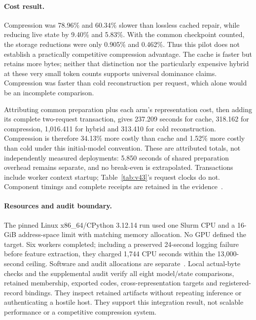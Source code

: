 \documentclass[10pt,twocolumn,letterpaper]{article}
\begin{document}
\paragraph{Cost result.}
Compression was 78.96\% and 60.34\% slower than lossless cached repair, while
reducing live state by 9.40\% and 5.83\%. With the common checkpoint counted, the
storage reductions were only 0.905\% and 0.462\%. Thus this pilot does not establish
a practically competitive compression advantage. The cache is faster but retains
more bytes; neither that distinction nor the particularly expensive hybrid at
these very small token counts supports universal dominance claims. Compression
was faster than cold reconstruction per request, which alone would be an
incomplete comparison.

Attributing common preparation plus each arm's representation cost, then adding
its complete two-request transaction, gives 237.209 seconds for cache, 318.162
for compression, 1,016.411 for hybrid and 313.410 for cold reconstruction.
Compression is therefore 34.13\% more costly than cache and 1.52\% more costly
than cold under this initial-model convention. These are attributed totals,
not independently measured deployments: 5.850 seconds of shared preparation
overhead remains separate, and no break-even is extrapolated. Transactions
include worker context startup; Table~\ref{tab:v43}'s request clocks do not.
Component timings and complete receipts are retained in the evidence~\cite{v43}.

\paragraph{Resources and audit boundary.}
The pinned Linux x86\_64/CPython 3.12.14 run used one Slurm CPU and a 16-GiB
address-space limit with matching memory allocation. No GPU defined the target.
Six workers completed; including a preserved 24-second logging failure before
feature extraction, they charged 1,744 CPU seconds within the 13,000-second
ceiling. Software and audit allocations are separate~\cite{v43}.
Local actual-byte checks and the supplemental audit verify all eight model/state
comparisons, retained membership, exported codes, cross-representation targets
and registered-record bindings. They inspect retained artifacts without repeating
inference or authenticating a hostile host. They support this integration result,
not scalable performance or a competitive compression system.
\end{document}

